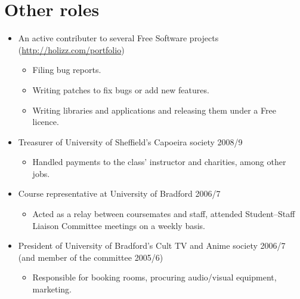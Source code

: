 \documentclass{article}
\newcommand{\iri}[1]{\url{#1}}
\begin{document}
\section{Other roles}
\begin{itemize}
\item An active contributer to several Free Software projects (\iri{http://holizz.com/portfolio})
  \begin{itemize}
  \item Filing bug reports.
  \item Writing patches to fix bugs or add new features.
  \item Writing libraries and applications and releasing them under a Free licence.
  \end{itemize}
\item Treasurer of University of Sheffield's Capoeira society 2008/9
  \begin{itemize}
  \item Handled payments to the class' instructor and charities, among other jobs.
  \end{itemize}
\item Course representative at University of Bradford 2006/7
  \begin{itemize}
  \item Acted as a relay between coursemates and staff, attended Student--Staff Liaison Committee meetings on a weekly basis.
  \end{itemize}
\item President of University of Bradford's Cult TV and Anime society 2006/7 (and member of the committee 2005/6)
  \begin{itemize}
  \item Responsible for booking rooms, procuring audio/visual equipment, marketing.
  \end{itemize}
\end{itemize}

\break
\end{document}
